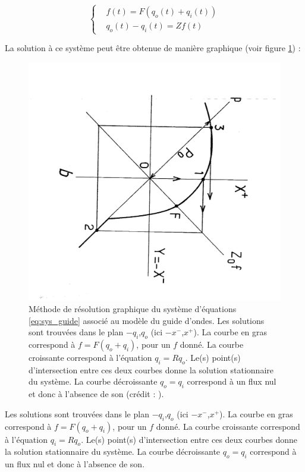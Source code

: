 \documentclass[atiam, article]{rapport} %
\begin{document}
\begin{equation}
    \left\{\begin{split}
        &f(t)=F(q_o(t)+q_i(t))\\
        &q_o(t) - q_i(t) = Zf(t)
    \end{split}
    \right.
\label{eq:sys_guide}
\end{equation}

La solution à ce système peut être obtenue de manière graphique (voir figure \ref{fig:po_pi}) : 

\begin{figure}
    \centering
    \includegraphics[angle=90,scale=0.3]{report/Images/po_pi.png}
    \caption{Méthode de résolution graphique du système d'équations \ref{eq:sys_guide} associé au modèle du guide d'ondes. Les solutions sont trouvées dans le plan $-q_i$,$q_o$ (ici $-x^-$,$x^+$). La courbe en gras correspond à $f = F(q_o+q_i)$, pour un $f$ donné. La courbe croissante correspond à l'équation $q_i=Rq_o$. Le(s) point(s) d'intersection entre ces deux courbes donne la solution stationnaire du système. La courbe décroissante $q_o=q_i$ correspond à un flux nul et donc à l'absence de son (crédit : \cite{maganza_bifurcations_1986}).}
    \label{fig:po_pi}
\end{figure}

Les solutions sont trouvées dans le plan $-q_i$,$q_o$ (ici $-x^-$,$x^+$). La courbe en gras correspond à $f = F(q_o+q_i)$, pour un $f$ donné. La courbe croissante correspond à l'équation $q_i=Rq_o$. Le(s) point(s) d'intersection entre ces deux courbes donne la solution stationnaire du système. La courbe décroissante $q_o=q_i$ correspond à un flux nul et donc à l'absence de son. 
\end{document}
